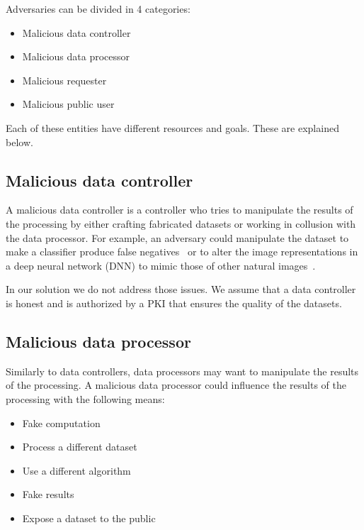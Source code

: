 Adversaries can be divided in 4 categories:

\begin{itemize}
  \item Malicious data controller
  \item Malicious data processor
  \item Malicious requester
  \item Malicious public user
\end{itemize}

Each of these entities have different resources and goals. These are explained below.

\subsection{Malicious data controller}
\label{solution:treat_model:mcontroller}

A malicious data controller is a controller who tries to manipulate the results of the processing by either crafting fabricated datasets or working in collusion with the data processor. For example, an adversary could manipulate the dataset to make a classifier produce false negatives~\cite{dalvi2004adversarial} or to alter the image representations in a deep neural network (DNN) to mimic those of other natural images~\cite{sabour2015adversarial}.

In our solution we do not address those issues. We assume that a data controller is honest and is authorized by a PKI that ensures the quality of the datasets.

\subsection{Malicious data processor}
\label{solution:treat_model:mprocessor}

Similarly to data controllers, data processors may want to manipulate the results of the processing. A malicious data processor could influence the results of the processing with the following means:

\begin{itemize}
  \item Fake computation
  \item Process a different dataset
  \item Use a different algorithm
  \item Fake results
  \item Expose a dataset to the public
\end{itemize}

